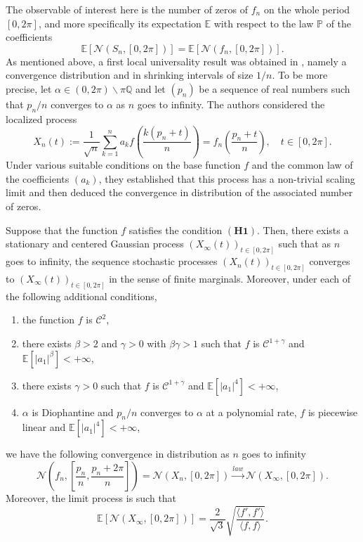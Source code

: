 \documentclass{svproc}
\begin{document}
The observable of interest here is the number of zeros of $f_n$ on the whole period $[0,2\pi]$, and more specifically its expectation $\mathbb E$ with respect to the law $\mathbb P$ of the coefficients
\[
\mathbb E\left[\mathcal{N}(S_n,[0,2\pi])\right]= \mathbb E\left[\mathcal{N}(f_n,[0,2\pi])\right].
\]
As mentioned above, a first local universality result was obtained in \cite{AP20IMRN}, namely a convergence  distribution and in shrinking intervals of size $1/n$. To be more precise, let $\alpha \in (0,2\pi) \backslash \pi\mathbb Q$ and let $(p_n)$ be a sequence of real numbers such that $p_n/n$ converges to $\alpha$ as $n$ goes to infinity. The authors considered the localized process 
\[
X_n(t)  :=\displaystyle{\frac{1}{\sqrt{n}} \sum_{k=1}^n a_k   f\left( \frac{k(p_n+t)}{n} \right)}=f_n\left( \frac{p_n+t}{n}\right), \quad t \in [0,2\pi].
\]
Under various suitable conditions on the base function $f$ and the common law of the coefficients $(a_k)$, they  established that this process has a non-trivial scaling limit and then deduced the convergence in distribution of the associated number of zeros.

\begin{theorem}\label{thm.IMRN}
Suppose that the function $f$ satisfies the condition $\mathbf{(H1)}$. {Then, there exists a stationary and centered Gaussian process $(X_{\infty}(t))_{t \in [0, 2\pi]}$} such that as $n$ goes to infinity, the sequence stochastic processes $(X_n(t))_{t \in [0,2\pi]}$
converges to $(X_{\infty}(t))_{t \in [0, 2\pi]}$ in the sense of finite marginals.
Moreover, under each of the following additional conditions,
\begin{enumerate}
\item the function $f$ is $\mathcal C^2$,
\item there exists $\beta>2$ and $\gamma>0$ with $\beta \gamma  >1$  such that $f$ is $\mathcal C^{1+\gamma}$ and $\mathbb E[|a_1|^{\beta}]<+\infty$,
\item there exists $\gamma>0$ such that $f$ is $\mathcal C^{1+\gamma}$ and $\mathbb E[|a_1|^4]<+\infty$,
\item $\alpha$ is Diophantine and $p_n/n$ converges to $\alpha$ at a polynomial rate, $f$ is piecewise linear and $\mathbb E[|a_1|^4]<+\infty$,
\end{enumerate}
\smallskip
we have the following convergence in distribution as $n$ goes to infinity
\[
\mathcal N\left( f_n, \left[ \frac{p_n}{n}, \frac{p_n+2\pi}{n}  \right]\right) =\mathcal N\left( X_{n} , \left[ 0, 2\pi \right]\right) \xrightarrow{law} \mathcal N\left( X_{\infty} , \left[ 0, 2\pi \right]\right).
\]
Moreover, the limit process is such that 
\[
\mathbb E\left[ \mathcal N\left( X_{\infty} , \left[ 0, 2\pi \right]\right)\right] = \frac{2}{\sqrt{3}} \sqrt{\frac{\langle f', f'\rangle}{\langle f, f\rangle}}.
\]
\end{theorem}
\end{document}
